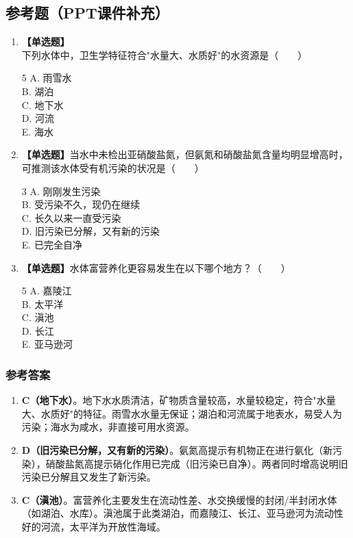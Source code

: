 \subsection*{参考题（PPT课件补充）}

\begin{enumerate}[leftmargin=*, itemsep=8pt]
    \item \textbf{【单选题】}下列水体中，卫生学特征符合"水量大、水质好"的水资源是（~~~~）
    \begin{multicols}{5}
    A. 雨雪水 \\
    B. 湖泊 \\
    C. 地下水 \\
    D. 河流 \\
    E. 海水
    \end{multicols}
    \item \textbf{【单选题】}当水中未检出亚硝酸盐氮，但氨氮和硝酸盐氮含量均明显增高时，可推测该水体受有机污染的状况是（~~~~）
    \begin{multicols}{3}
    A. 刚刚发生污染 \\
    B. 受污染不久，现仍在继续 \\
    C. 长久以来一直受污染 \\
    D. 旧污染已分解，又有新的污染 \\
    E. 已完全自净
    \end{multicols}
    \item \textbf{【单选题】}水体富营养化更容易发生在以下哪个地方？（~~~~）
    \begin{multicols}{5}
    A. 嘉陵江 \\
    B. 太平洋 \\
    C. 滇池 \\
    D. 长江 \\
    E. 亚马逊河
    \end{multicols}
\end{enumerate}

\subsubsection*{参考答案}
\begin{enumerate}[leftmargin=*, itemsep=5pt]
    \item \textbf{C（地下水）}。地下水水质清洁，矿物质含量较高，水量较稳定，符合"水量大、水质好"的特征。雨雪水水量无保证；湖泊和河流属于地表水，易受人为污染；海水为咸水，非直接可用水资源。
    \item \textbf{D（旧污染已分解，又有新的污染）}。氨氮高提示有机物正在进行氨化（新污染），硝酸盐氮高提示硝化作用已完成（旧污染已自净）。两者同时增高说明旧污染已分解且又发生了新污染。
    \item \textbf{C（滇池）}。富营养化主要发生在流动性差、水交换缓慢的封闭/半封闭水体（如湖泊、水库）。滇池属于此类湖泊，而嘉陵江、长江、亚马逊河为流动性好的河流，太平洋为开放性海域。
\end{enumerate}

\newpage

\newpage